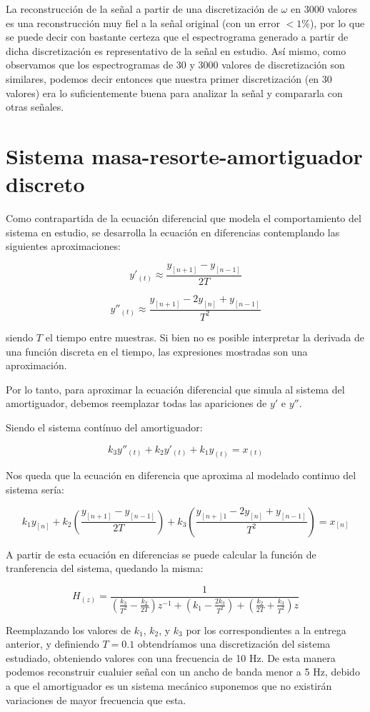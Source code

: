 \documentclass{article}
\begin{document}
La reconstrucción de la señal a partir de una discretización de $\omega$ en 3000 valores es una reconstrucción muy fiel a la señal original (con un error $<1\%$), por lo que se puede decir con bastante certeza que el espectrograma generado a partir de dicha discretización es representativo de la señal en estudio.
Así mismo, como observamos que los espectrogramas de 30 y 3000 valores de discretización son similares, podemos decir entonces que nuestra primer discretización (en 30 valores) era lo suficientemente buena para analizar la señal y compararla con otras señales.
	        
\newpage \section{Sistema masa-resorte-amortiguador discreto}

Como contrapartida de la ecuación diferencial que modela el comportamiento del sistema en estudio, se desarrolla la ecuación en diferencias contemplando las siguientes aproximaciones:

$$y'_{(t)} \approx \frac{y_{[n+1]}-y_{[n-1]}}{2T}$$

$$y''_{(t)} \approx \frac{y_{[n+1]} - 2 y_{[n]} + y_{[n-1]}}{T^2}$$

siendo $T$ el tiempo entre muestras. Si bien no es posible interpretar la derivada de una función discreta en el tiempo, las expresiones mostradas son una aproximación.


Por lo tanto, para aproximar la ecuación diferencial que simula al sistema del amortiguador, debemos reemplazar todas las apariciones de $y'$ e $y''$.

Siendo el sistema contínuo del amortiguador:

$$k_3 y''_{(t)} + k_2 y'_{(t)} + k_1 y_{(t)} = x_{(t)}$$

Nos queda que la ecuación en diferencia que aproxima al modelado continuo del sistema sería:

$$k_1 y_{[n]} + k_2 \left(\frac{y_{[n+1]}-y_{[n-1]}}{2T}\right) + k_3 \left(\frac{y_{[n+]1} - 2 y_{[n]} + y_{[n-1]}}{T^2}\right)= x_{[n]}$$

A partir de esta ecuación en diferencias se puede calcular la función de tranferencia del sistema, quedando la misma:

$$H_{(z)} = \frac{1}{\left(\frac{k_3}{T^2} - \frac{k_2}{2T}\right) z^{-1} + \left(k_1-\frac{2k_3}{T^2}\right) + \left(\frac{k_2}{2T} + \frac{k_3}{T^2}\right) z} $$


Reemplazando los valores de $k_1$, $k_2$, y $k_3$ por los correspondientes a la entrega anterior, y definiendo $T=0.1$ obtendríamos una discretización del sistema estudiado, obteniendo valores con una frecuencia de 10 Hz. De esta manera podemos reconstruir cualuier señal con un ancho de banda menor a 5 Hz, debido a que el amortiguador es un sistema mecánico suponemos que  no existirán variaciones de mayor frecuencia que esta.
\end{document}
